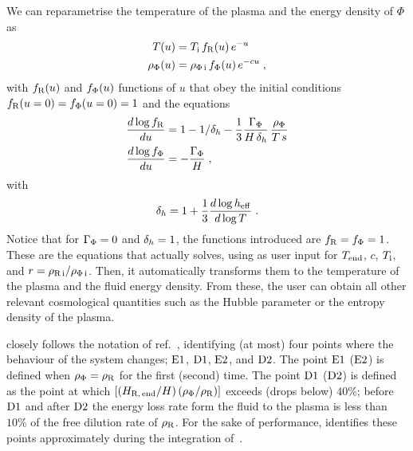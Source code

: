 \documentclass[11pt,a4paper]{article}
\begin{document}
We can reparametrise the temperature of the plasma and the energy density of $\Phi$ as 
%
\begin{align}
	T(u) &= T_{\rm i}{}  \, f_{\rm R}(u) \, e^{-u}  \label{eq:fR_def} \\ 
	\rho_{\Phi}(u) &= \rho_{\Phi\,{\rm i}} \, f_{\Phi}(u) \label{eq:fPhi_def} \, e^{-cu}\;,
\end{align}
%
with $f_{\rm R}(u)$ and $f_{\Phi}(u)$ functions of $u$ that obey the initial conditions $f_{\rm R}(u=0)=f_{\Phi}(u=0)=1$ and the equations
%
\begin{align}
	\dfrac{d\log f_{\rm R} }{du} &=  1- 1/\delta_h{}- \dfrac{1}{3}\dfrac{\Gamma_{\Phi}}{H\,\delta_h{}} \, \dfrac{\rho_{\Phi}}{T\,s}   \label{eq:dlogfRdu} \\ 
	\dfrac{d\log f_{\Phi}}{du} &= -\dfrac{\Gamma_{\Phi}}{H} \label{eq:dlogfPhidu} \;,
\end{align}
%
with 
\begin{equation}
	\delta_h{} = 1+ \dfrac{1}{3} \dfrac{d\log h_{\rm eff}{}}{d\log T}\;.
	\label{eq:dh_def}
\end{equation}
%
Notice that for $\Gamma_{\Phi}=0$ and $\delta_h{}=1$, the functions introduced are $f_{\rm R}=f_{\Phi}=1$. These are the equations that \nsc actually solves, using as user input for $T_{\rm end}{}$, $c$, $T_{\rm i}{}$, and $r=\rho_{\rm R\,i}/\rho_{\Phi\,{\rm i}}$. Then, it automatically transforms them to the temperature of the plasma and the fluid energy density. From these, the user can obtain all other relevant cosmological quantities such as the Hubble parameter or the entropy density of the plasma.

\nsc closely follows the notation of ref.~\cite{Arias:2020qty}, identifying (at most) four points where the behaviour of the system changes; ${\rm E1}{}$, ${\rm D1}{}$, ${\rm E2}{}$, and ${\rm D2}{}$. The point ${\rm E1}{}$ (${\rm E2}{}$) is defined when $\rho_{\Phi}=\rho_{\rm R}$ for the first (second) time. The point ${\rm D1}{}$ (${\rm D2}{}$) is defined as the point at which $\left[  (H_{\rm R,\,end}/H) \, (\rho_{\Phi}/\rho_{\rm R})  \right]$ exceeds (drops below) $40\%$; \ie before ${\rm D1}{}$ and after ${\rm D2}{}$ the energy loss rate form the fluid to the plasma is less than $10\%$ of the free dilution rate of $\rho_{\rm R}$.
%
For the sake of performance, \nsc identifies these points approximately during the integration of~. 
\end{document}

